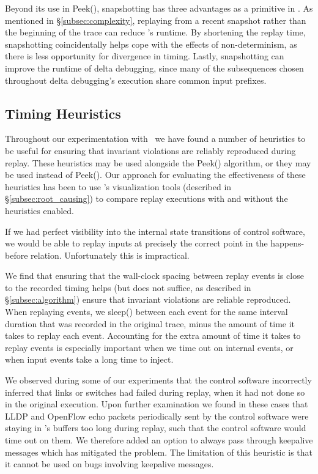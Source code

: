 Beyond its use in Peek(), snapshotting has three advantages as a primitive
in \projectname. As mentioned in \S\ref{subsec:complexity}, replaying from a
recent snapshot rather than the beginning of the trace can reduce \simulator's runtime.
By shortening the replay time, snapshotting coincidentally helps cope
with the effects of non-determinism, as there is less opportunity for
divergence in timing. Lastly, snapshotting can improve the runtime of delta
debugging, since many of the subsequences chosen throughout delta debugging's
execution share common input prefixes.

\subsection{Timing Heuristics}
\label{subsec:timing_heuristics}

Throughout our experimentation with \projectname~we have found a number of
heuristics to be useful for ensuring that invariant violations are reliably reproduced during replay.
These heuristics may be used alongside the Peek() algorithm, or they may be
used instead of Peek(). Our approach for evaluating the effectiveness
of these heuristics has been to use \projectname's visualization tools
(described in \S\ref{subsec:root_causing}) to compare replay executions with and
without the heuristics enabled.

 If we had perfect visibility into
the internal state transitions of control software, we would be able to replay inputs at precisely the correct point in
the happens-before relation. Unfortunately this is impractical.

We find that ensuring that the wall-clock spacing between replay events
is close to the recorded timing helps (but does not suffice, as described in
\S\ref{subsec:algorithm}) ensure that invariant violations are reliable
reproduced. When replaying events, we sleep() between each
event for the same interval duration that was recorded in the original trace,
minus the amount of time it takes to replay each event. Accounting for the
extra amount of time it takes to replay events is especially important when we
time out on internal events, or when input events take a long time to inject.

 We observed during some
of our experiments that the control software incorrectly inferred that links or switches had
failed during replay, when it had not done so in the original execution.
Upon further examination we found in these cases that LLDP and OpenFlow echo
packets periodically sent by the control software were
staying in \projectname's buffers too long during replay, such that the
control software would time out on them. We therefore added an option to always pass through
keepalive messages which has mitigated the problem. The limitation of this
heuristic is that it cannot be used on bugs involving keepalive messages.

